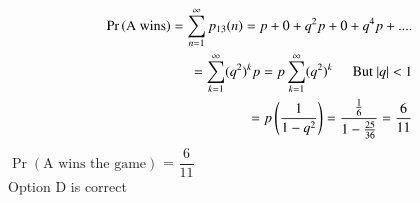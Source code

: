 \documentclass[journal,12pt,twocolumn]{IEEEtran}
\theoremstyle{definition}
\providecommand{\pr}[1]{\ensuremath{\Pr\left(#1\right)}}
\numberwithin{equation}{subsection}
\begin{document}
\onehalfspacing
\begin{align*}
    \pr{\text{A wins}} = \sum_{n=1}^{\infty} p_{13}(n)
    = p + 0 + q^2p + 0 + q^4p + ....\\
    = \sum_{k=1}^{\infty} (q^2)^k p
    = p \sum_{k=1}^{\infty} (q^2)^k \hspace{0.5cm} \text{But $|q| <$ 1}\\
    = p \left(\dfrac{1}{1 - q^2}\right)
    =\dfrac{\frac{1}{6}}{1 - \frac{25}{36}} = \dfrac{6}{11}
\end{align*}
\centering \Large
\pr{\text{A wins the game}} = $\dfrac{6}{11}$\\
Option D is correct
\end{document}
